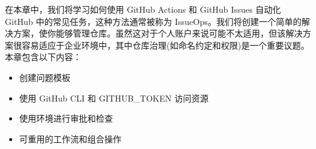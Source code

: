在本章中，我们将学习如何使用 GitHub Actions 和 GitHub Issues 自动化 GitHub 中的常见任务，这种方法通常被称为 IssueOps。我们将创建一个简单的解决方案，使你能够管理仓库。虽然这对于个人账户来说可能不太适用，但该解决方案很容易适应于企业环境中，其中仓库治理(如命名约定和权限)是一个重要议题。本章包含以下内容：

\begin{itemize}
\item 
创建问题模板

\item 
使用 GitHub CLI 和 GITHUB\_TOKEN 访问资源

\item 
使用环境进行审批和检查

\item 
可重用的工作流和组合操作
\end{itemize}
